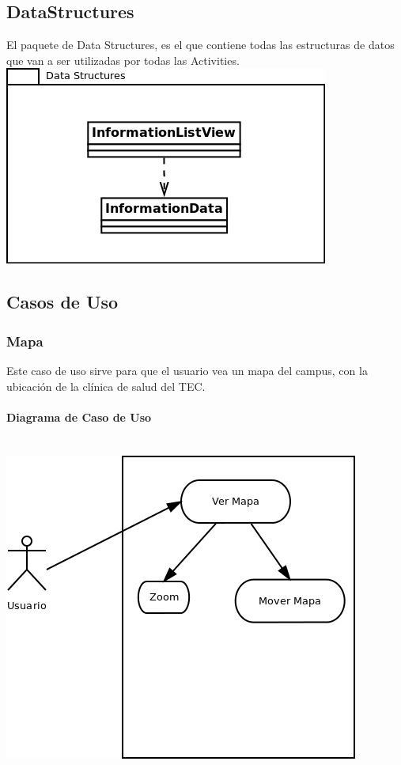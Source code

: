 \documentclass[12pt]{article}
\begin{document}
\subsection{DataStructures}
El paquete de Data Structures, es el que contiene todas las estructuras de datos que van a ser utilizadas por todas las Activities.\\
\includegraphics[scale=0.5]{"../Documentos/Diagramas/DS"}

\subsection{Casos de Uso}

\subsubsection{Mapa}
Este caso de uso sirve para que el usuario vea un mapa del campus, con la ubicaci\'on de la cl\'inica de salud del TEC.

\paragraph{Diagrama de Caso de Uso}\ \\
\includegraphics[scale=0.6]{"../Documentos/Diagramas/CU1_"}
\end{document}

